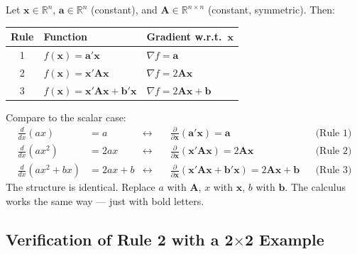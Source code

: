 \documentclass[11pt,a4paper]{article}
\begin{document}
\begin{formaldef}
Let $\bm{x} \in \mathbb{R}^n$, $\bm{a} \in \mathbb{R}^n$ (constant), and $\bm{A} \in \mathbb{R}^{n \times n}$ (constant, symmetric). Then:

\medskip
\renewcommand{\arraystretch}{1.6}
\begin{tabular}{c l l}
\toprule
\textbf{Rule} & \textbf{Function} & \textbf{Gradient w.r.t.\ $\bm{x}$} \\
\midrule
1 & $f(\bm{x}) = \bm{a}'\bm{x}$ & $\nabla f = \bm{a}$ \\
2 & $f(\bm{x}) = \bm{x}'\bm{A}\bm{x}$ & $\nabla f = 2\bm{A}\bm{x}$ \\
3 & $f(\bm{x}) = \bm{x}'\bm{A}\bm{x} + \bm{b}'\bm{x}$ & $\nabla f = 2\bm{A}\bm{x} + \bm{b}$ \\
\bottomrule
\end{tabular}
\end{formaldef}

\begin{intuition}
Compare to the scalar case:
\[
\begin{aligned}
\frac{d}{dx}(ax) &= a &\longleftrightarrow&\quad \frac{\partial}{\partial \bm{x}}(\bm{a}'\bm{x}) = \bm{a} &&\text{(Rule 1)}\\[4pt]
\frac{d}{dx}(ax^2) &= 2ax &\longleftrightarrow&\quad \frac{\partial}{\partial \bm{x}}(\bm{x}'\bm{A}\bm{x}) = 2\bm{A}\bm{x} &&\text{(Rule 2)}\\[4pt]
\frac{d}{dx}(ax^2 + bx) &= 2ax + b &\longleftrightarrow&\quad \frac{\partial}{\partial \bm{x}}(\bm{x}'\bm{A}\bm{x} + \bm{b}'\bm{x}) = 2\bm{A}\bm{x} + \bm{b} &&\text{(Rule 3)}
\end{aligned}
\]
The structure is identical. Replace $a$ with $\bm{A}$, $x$ with $\bm{x}$, $b$ with $\bm{b}$. The calculus works the same way --- just with bold letters.
\end{intuition}

\subsection*{Verification of Rule 2 with a 2$\times$2 Example}
\end{document}
